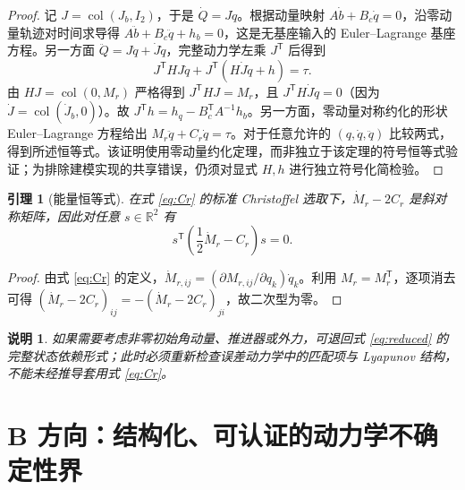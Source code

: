 \documentclass[journal,onecolumn]{IEEEtran}
\newtheorem{lemma}{引理}[section]
\newtheorem{remark}{说明}[section]
\newcommand{\R}{\mathbb R}
\newcommand{\tr}{\mathsf T}
\begin{document}
\begin{proof}
记 $J=\operatorname{col}(J_b,I_2)$，于是 $\dot Q=J\dot q$。根据动量映射 $A\dot b+B_c\dot q=0$，沿零动量轨迹对时间求导得
$A\ddot b+B_c\ddot q+h_b=0$，这是无基座输入的 Euler--Lagrange 基座方程。另一方面 $\ddot Q=J\ddot q+\dot J\dot q$，完整动力学左乘 $J^\tr$ 后得到
\begin{equation}
 J^\tr HJ\ddot q+J^\tr(H\dot J\dot q+h)=\tau.\label{eq:projected}
\end{equation}
由 $HJ=\operatorname{col}(0,M_r)$ 严格得到 $J^\tr HJ=M_r$，且 $J^\tr H\dot J\dot q=0$（因为 $\dot J=\operatorname{col}(\dot J_b,0)$）。故 $J^\tr h=h_q-B_c^\tr A^{-1}h_b$。另一方面，零动量对称约化的形状 Euler--Lagrange 方程给出 $M_r\ddot q+C_r\dot q=\tau$。对于任意允许的 $(q,\dot q,\ddot q)$ 比较两式，得到所述恒等式。该证明使用零动量约化定理，而非独立于该定理的符号恒等式验证；为排除建模实现的共享错误，仍须对显式 $H,h$ 进行独立符号化简检验。
\end{proof}

\begin{lemma}[能量恒等式]
在式 \eqref{eq:Cr} 的标准 Christoffel 选取下，$\dot M_r-2C_r$ 是斜对称矩阵，因此对任意 $s\in\R^2$ 有
\begin{equation}
 s^\tr\left(\frac12\dot M_r-C_r\right)s=0.
\end{equation}
\end{lemma}
\begin{proof}
由式 \eqref{eq:Cr} 的定义，$\dot M_{r,ij}=(\partial M_{r,ij}/\partial q_k)\dot q_k$。利用 $M_r=M_r^\tr$，逐项消去可得 $(\dot M_r-2C_r)_{ij}=-(\dot M_r-2C_r)_{ji}$，故二次型为零。
\end{proof}
\begin{remark}
如果需要考虑非零初始角动量、推进器或外力，可退回式 \eqref{eq:reduced} 的完整状态依赖形式；此时必须重新检查误差动力学中的匹配项与 Lyapunov 结构，不能未经推导套用式 \eqref{eq:Cr}。
\end{remark}

\section{B 方向：结构化、可认证的动力学不确定性界}
\end{document}
